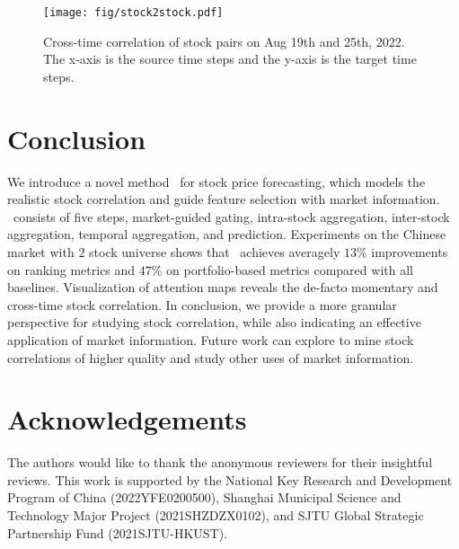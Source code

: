 \begin{figure}[t]
    \texttt{[image: fig/stock2stock.pdf]}
\caption{Cross-time correlation of stock pairs on Aug 19th and 25th, 2022. The x-axis is the source time steps and the y-axis is the target time steps. }
\label{fig:stock2stock}
\end{figure}
\section{Conclusion}
We introduce a novel method \frameworkname~for stock price forecasting, which models the realistic stock correlation and guide feature selection with market information.
\frameworkname~consists of five steps, market-guided gating, intra-stock aggregation, inter-stock aggregation, temporal aggregation, and prediction.
Experiments on the Chinese market with $2$ stock universe shows that \frameworkname~achieves averagely $13\%$ improvements on ranking metrics and $47\%$ on portfolio-based metrics compared with all baselines.
Visualization of attention maps reveals the de-facto momentary and cross-time stock correlation. 
In conclusion, we provide a more granular perspective for studying stock correlation, while also indicating an effective application of market information. Future work can explore to mine stock correlations of higher quality and study other uses of market information.

\section*{Acknowledgements}
The authors would like to thank the anonymous reviewers for their insightful reviews. 
This work is supported by the National Key Research and Development Program of China (2022YFE0200500), Shanghai Municipal Science and Technology Major Project (2021SHZDZX0102), and SJTU Global Strategic Partnership Fund (2021SJTU-HKUST).

